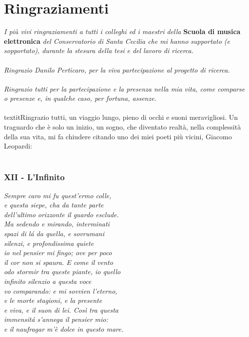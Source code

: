 

\chapter*{Ringraziamenti}

\textit{I più vivi ringraziamenti a tutti i colleghi ed i maestri della} \textbf{Scuola di musica elettronica} \textit{del Conservatorio di Santa Cecilia che mi hanno supportato (e sopportato), durante la stesura della tesi e del lavoro di ricerca.} \\
\\
\textit{Ringrazio Danilo Perticaro, per la viva partecipazione al progetto di ricerca.}
\\ \\
\textit{Ringrazio tutti per la partecipazione e la presenza nella mia vita, come comparse o presenze e, in qualche caso, per fortuna, assenze.} \\ \\

textit{Ringrazio tutti, un viaggio lungo, pieno di occhi e suoni meravigliosi. Un traguardo che è solo un inizio, un sogno, che diventato realtà, nella complessità della sua vita, mi fa chiudere citando uno dei miei poeti più vicini, Giacomo Leopardi:} \\
\\
\subsection*{XII - L'Infinito}
\leftskip=1cm
	\textit{Sempre caro mi fu quest'ermo colle,\\
	e questa siepe, cha da tante parte \\
	dell'ultimo orizzonte il guardo esclude. \\
	Ma sedendo e mirando, interminati \\
	spazi di l\'a da quella, e sovrumani \\
	silenzi, e profondissima quiete \\
	io nel pensier mi fingo; ove per poco \\
	il cor non si spaura. E come il vento \\
	odo stormir tra queste piante, io quello \\
	infinito silenzio a questa voce \\
	vo comparando: e mi sovvien l'eterno, \\
	e le morte stagioni, e la presente \\
	e viva, e il suon di lei. Così tra questa \\
	immensit\'a s'annega il pensier mio: \\
	e il naufragar m'è dolce in questo mare.} \\

\clearpage

		    
